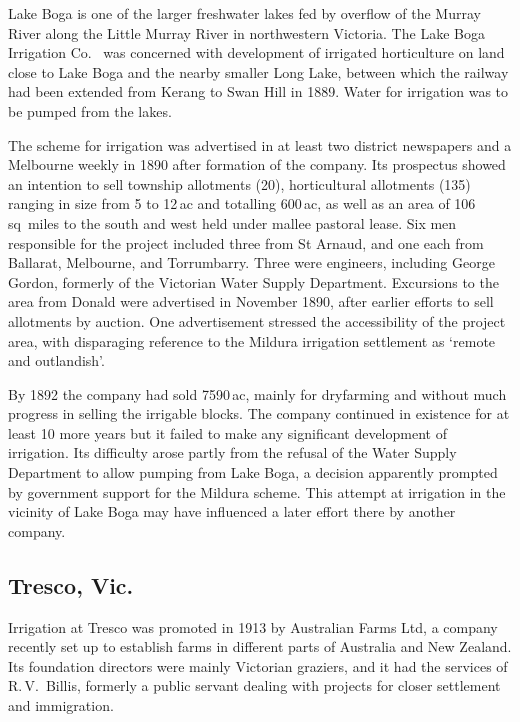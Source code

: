 Lake Boga is one of the larger freshwater lakes fed by overflow of the
Murray River along the Little Murray River 
in northwestern Victoria.  The Lake Boga Irrigation Co.\  was concerned with development of irrigated
horticulture on land close to Lake Boga and the nearby smaller Long
Lake,  between which the railway had been
extended from Kerang  to Swan Hill  in 1889.  Water for irrigation was to be pumped from the
lakes.

The scheme for irrigation was advertised in at least two district
newspapers and a Melbourne weekly in 1890 after formation of the
company.  Its prospectus showed an intention to sell township
allotments (20), horticultural allotments (135) ranging in size from 5
to 12\,ac and totalling 600\,ac, as well as an area of 106\,sq~miles
to the south and west held under mallee pastoral lease. Six men
responsible for the project included three from St Arnaud, and one
each from Ballarat, Melbourne, and Torrumbarry.  Three were engineers,
including George Gordon, formerly of the Victorian Water Supply
Department.  Excursions to the area from Donald were advertised in
November 1890, after earlier efforts to sell allotments by auction.
One advertisement stressed the accessibility of the project area, with
disparaging reference to the Mildura irrigation settlement as `remote
and outlandish'.

By 1892 the company had sold 7590\,ac, mainly for dryfarming and
without much progress in selling the irrigable blocks.  The company
continued in existence for at least 10 more years but it failed to
make any significant development of irrigation.  Its difficulty arose
partly from the refusal of the Water Supply Department to allow
pumping from Lake Boga, a decision apparently prompted by government
support for the Mildura scheme.  This attempt at irrigation in the
vicinity of Lake Boga may have influenced a later effort there by
another company.

\subsection*{Tresco, Vic.}

Irrigation at Tresco was promoted in 1913 by Australian Farms Ltd, a
company recently set up to establish farms in different parts of
Australia and New Zealand.  Its foundation directors were mainly
Victorian graziers, and it had the services of R.\,V.~Billis, formerly
a public servant dealing with projects for closer settlement and
immigration.


